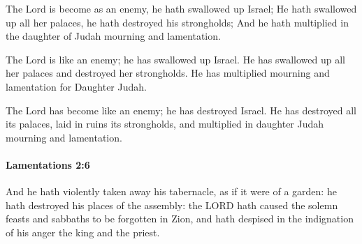			\begin{versebox}
					\item[BHS] 
					\item[LXX] 
					\item[ASV] The Lord is become as an enemy, he hath swallowed up Israel; He hath swallowed up all her palaces, he hath destroyed his strongholds; And he hath multiplied in the daughter of Judah mourning and lamentation.
					\item[NIV] The Lord is like an enemy; he has swallowed up Israel. He has swallowed up all her palaces and destroyed her strongholds. He has multiplied mourning and lamentation for Daughter Judah.
					\item[NRSV] The Lord has become like an enemy; he has destroyed Israel. He has destroyed all its palaces, laid in ruins its strongholds, and multiplied in daughter Judah mourning and lamentation.
			\end{versebox}

		\paragraph{Lamentations 2:6} %
			\label{LAMENTATIONS-2-6}

			And he hath violently taken away his tabernacle, as if it were of a garden: he hath destroyed his places of the assembly: the LORD hath caused the solemn feasts and sabbaths to be forgotten in Zion, and hath despised in the indignation of his anger the king and the priest.

